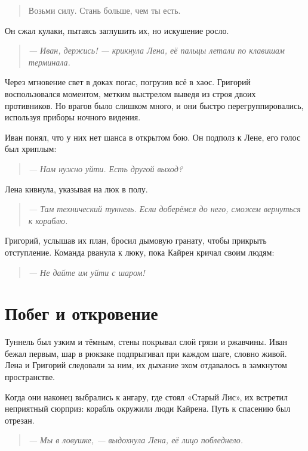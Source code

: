 \documentclass[12pt,a4paper]{book}
\newenvironment{dialogue}{\begin{quote}\itshape}{\end{quote}}
\begin{document}
\begin{quote}
Возьми силу. Стань больше, чем ты есть.
\end{quote}

Он сжал кулаки, пытаясь заглушить их, но искушение росло.

\begin{dialogue}
--- Иван, держись! --- крикнула Лена, её пальцы летали по клавишам терминала.
\end{dialogue}

Через мгновение свет в доках погас, погрузив всё в хаос. Григорий воспользовался моментом, метким выстрелом выведя из строя двоих противников. Но врагов было слишком много, и они быстро перегруппировались, используя приборы ночного видения.

Иван понял, что у них нет шанса в открытом бою. Он подполз к Лене, его голос был хриплым:

\begin{dialogue}
--- Нам нужно уйти. Есть другой выход?
\end{dialogue}

Лена кивнула, указывая на люк в полу.

\begin{dialogue}
--- Там технический туннель. Если доберёмся до него, сможем вернуться к кораблю.
\end{dialogue}

Григорий, услышав их план, бросил дымовую гранату, чтобы прикрыть отступление. Команда рванула к люку, пока Кайрен кричал своим людям:

\begin{dialogue}
--- Не дайте им уйти с шаром!
\end{dialogue}

\section*{Побег и откровение}

Туннель был узким и тёмным, стены покрывал слой грязи и ржавчины. Иван бежал первым, шар в рюкзаке подпрыгивал при каждом шаге, словно живой. Лена и Григорий следовали за ним, их дыхание эхом отдавалось в замкнутом пространстве.

Когда они наконец выбрались к ангару, где стоял «Старый Лис», их встретил неприятный сюрприз: корабль окружили люди Кайрена. Путь к спасению был отрезан.

\begin{dialogue}
--- Мы в ловушке, --- выдохнула Лена, её лицо побледнело.
\end{dialogue}
\end{document}
